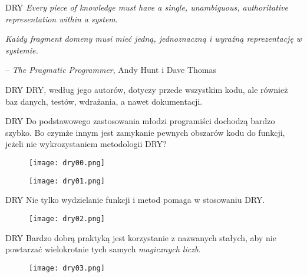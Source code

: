 \begin{frame}{DRY}	
	\emph{Every piece of knowledge must have a single, unambiguous, authoritative representation within a system}.
	
	\emph{Każdy fragment domeny musi mieć jedną, jednoznaczną i wyraźną reprezentację w systemie.}
	
	-- \emph{The Pragmatic Programmer}, Andy Hunt i Dave Thomas
\end{frame}

\begin{frame}{DRY}
	DRY, według jego autorów, dotyczy przede wszystkim kodu, ale również baz danych, testów, wdrażania, a nawet dokumentacji.
\end{frame}

\begin{frame}{DRY}
	Do podstawowego zastosowania młodzi programiści dochodzą bardzo szybko. Bo czymże innym jest zamykanie pewnych obszarów kodu do funkcji, jeżeli nie wykrozystaniem metodologii DRY?
\end{frame}

\begin{frame}
	\begin{figure} \centering
		\texttt{[image: dry00.png]}
	\end{figure}
\end{frame}

\begin{frame}
	\begin{figure} \centering
		\texttt{[image: dry01.png]}
	\end{figure}
\end{frame}

\begin{frame}{DRY}
	Nie tylko wydzielanie funkcji i metod pomaga w stosowaniu DRY.
\end{frame}

\begin{frame}
	\begin{figure} \centering
		\texttt{[image: dry02.png]}
	\end{figure}
\end{frame}

\begin{frame}{DRY}
	Bardzo dobrą praktyką jest korzystanie z nazwanych stałych, aby nie powtarzać wielokrotnie tych samych \emph{magicznych liczb}.
\end{frame}

\begin{frame}
	\begin{figure} \centering
		\texttt{[image: dry03.png]}
	\end{figure}
\end{frame}

